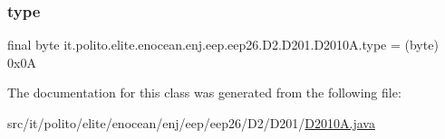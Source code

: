 \hypertarget{classit_1_1polito_1_1elite_1_1enocean_1_1enj_1_1eep_1_1eep26_1_1_d2_1_1_d201_1_1_d2010_a_aaa6d4f10ff2d81d26f411e76459ff48e}{}\label{classit_1_1polito_1_1elite_1_1enocean_1_1enj_1_1eep_1_1eep26_1_1_d2_1_1_d201_1_1_d2010_a_aaa6d4f10ff2d81d26f411e76459ff48e} 
\subsubsection{\texorpdfstring{type}{type}}
{\footnotesize\ttfamily final byte it.\+polito.\+elite.\+enocean.\+enj.\+eep.\+eep26.\+D2.\+D201.\+D2010\+A.\+type = (byte) 0x0A\hspace{0.3cm}{\ttfamily [static]}}



The documentation for this class was generated from the following file\+:\begin{DoxyCompactItemize}
\item 
src/it/polito/elite/enocean/enj/eep/eep26/\+D2/\+D201/\hyperlink{_d2010_a_8java}{D2010\+A.\+java}\end{DoxyCompactItemize}
